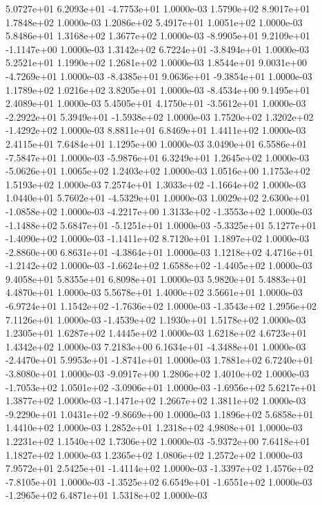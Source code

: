  5.0727e+01  6.2093e+01 -4.7753e+01  1.0000e-03
1.5790e+02 8.9017e+01 1.7848e+02  1.0000e-03
1.2086e+02 5.4917e+01 1.0051e+02  1.0000e-03
5.8486e+01 1.3168e+02 1.3677e+02  1.0000e-03
-8.9905e+01  9.2109e+01 -1.1147e+00  1.0000e-03
 1.3142e+02  6.7224e+01 -3.8494e+01  1.0000e-03
5.2521e+01 1.1990e+02 1.2681e+02  1.0000e-03
 1.8544e+01  9.0031e+00 -4.7269e+01  1.0000e-03
-8.4385e+01  9.0636e+01 -9.3854e+01  1.0000e-03
1.1789e+02 1.0216e+02 3.8205e+01  1.0000e-03
-8.4534e+00  9.1495e+01  2.4089e+01  1.0000e-03
 5.4505e+01  4.1750e+01 -3.5612e+01  1.0000e-03
-2.2922e+01  5.3949e+01 -1.5938e+02  1.0000e-03
 1.7520e+02  1.3202e+02 -1.4292e+02  1.0000e-03
8.8811e+01 6.8469e+01 1.4411e+02  1.0000e-03
2.4115e+01 7.6484e+01 1.1295e+00  1.0000e-03
 3.0490e+01  6.5586e+01 -7.5847e+01  1.0000e-03
-5.9876e+01  6.3249e+01  1.2645e+02  1.0000e-03
-5.0626e+01  1.0065e+02  1.2403e+02  1.0000e-03
1.0516e+00 1.1753e+02 1.5193e+02  1.0000e-03
 7.2574e+01  1.3033e+02 -1.1664e+02  1.0000e-03
 1.0440e+01  5.7602e+01 -4.5329e+01  1.0000e-03
 1.0029e+02  2.6300e+01 -1.0858e+02  1.0000e-03
-4.2217e+00  1.3133e+02 -1.3553e+02  1.0000e-03
-1.1488e+02  5.6847e+01 -5.1251e+01  1.0000e-03
-5.3325e+01  5.1277e+01 -1.4090e+02  1.0000e-03
-1.1411e+02  8.7120e+01  1.1897e+02  1.0000e-03
-2.8860e+00  6.8631e+01 -4.3864e+01  1.0000e-03
 1.1218e+02  4.4716e+01 -1.2142e+02  1.0000e-03
-1.6624e+02  1.6588e+02 -1.4405e+02  1.0000e-03
9.4058e+01 5.8355e+01 6.8098e+01  1.0000e-03
5.9820e+01 5.4883e+01 4.4870e+01  1.0000e-03
5.5678e+01 1.4000e+02 3.5661e+01  1.0000e-03
-6.9724e+01  1.1542e+02 -1.7636e+02  1.0000e-03
-1.3543e+02  1.2956e+02  7.1126e+01  1.0000e-03
-1.4539e+02  1.1930e+01  1.5178e+02  1.0000e-03
1.2305e+01 1.6287e+02 1.4445e+02  1.0000e-03
1.6218e+02 4.6723e+01 1.4342e+02  1.0000e-03
 7.2183e+00  6.1634e+01 -4.3488e+01  1.0000e-03
-2.4470e+01  5.9953e+01 -1.8741e+01  1.0000e-03
 1.7881e+02  6.7240e+01 -3.8080e+01  1.0000e-03
-9.0917e+00  1.2806e+02  1.4010e+02  1.0000e-03
-1.7053e+02  1.0501e+02 -3.0906e+01  1.0000e-03
-1.6956e+02  5.6217e+01  1.3877e+02  1.0000e-03
-1.1471e+02  1.2667e+02  1.3811e+02  1.0000e-03
-9.2290e+01  1.0431e+02 -9.8669e+00  1.0000e-03
1.1896e+02 5.6858e+01 1.4410e+02  1.0000e-03
1.2852e+01 1.2318e+02 4.9808e+01  1.0000e-03
1.2231e+02 1.1540e+02 1.7306e+02  1.0000e-03
-5.9372e+00  7.6418e+01  1.1827e+02  1.0000e-03
1.2365e+02 1.0806e+02 1.2572e+02  1.0000e-03
 7.9572e+01  2.5425e+01 -1.4114e+02  1.0000e-03
-1.3397e+02  1.4576e+02 -7.8105e+01  1.0000e-03
-1.3525e+02  6.6549e+01 -1.6551e+02  1.0000e-03
-1.2965e+02  6.4871e+01  1.5318e+02  1.0000e-03

